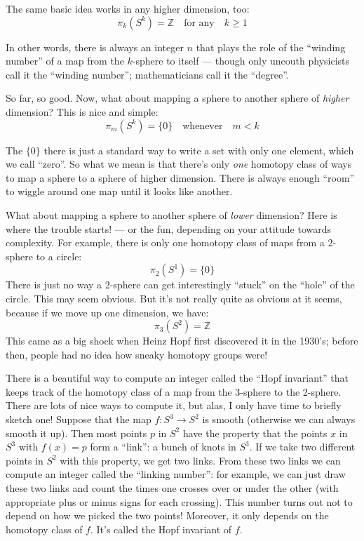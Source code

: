 \documentclass{article}
\begin{document}
The same basic idea works in any higher dimension, too:
\[\pi_k(S^k) = \mathbb{Z} \quad\text{for any}\quad k\geqslant 1\]

In other words, there is always an integer \(n\) that plays the role of
the ``winding number'' of a map from the \(k\)-sphere to itself ---
though only uncouth physicists call it the ``winding number'';
mathematicians call it the ``degree''.

So far, so good. Now, what about mapping a sphere to another sphere of
\emph{higher} dimension? This is nice and simple:
\[\pi_m(S^k) =\{0\} \quad\text{whenever}\quad m < k\]

The \(\{0\}\) there is just a standard way to write a set with only one
element, which we call ``zero''. So what we mean is that there's only
\emph{one} homotopy class of ways to map a sphere to a sphere of higher
dimension. There is always enough ``room'' to wiggle around one map
until it looks like another.

What about mapping a sphere to another sphere of \emph{lower} dimension?
Here is where the trouble starts! --- or the fun, depending on your
attitude towards complexity. For example, there is only one homotopy
class of maps from a 2-sphere to a circle: \[\pi_2(S^1) = \{0\}\] There
is just no way a 2-sphere can get interestingly ``stuck'' on the
``hole'' of the circle. This may seem obvious. But it's not really quite
as obvious at it seems, because if we move up one dimension, we have:
\[\pi_3(S^2) = \mathbb{Z}\] This came as a big shock when Heinz Hopf
first discovered it in the 1930's; before then, people had no idea how
sneaky homotopy groups were!

There is a beautiful way to compute an integer called the ``Hopf
invariant'' that keeps track of the homotopy class of a map from the
3-sphere to the 2-sphere. There are lots of nice ways to compute it, but
alas, I only have time to briefly sketch one! Suppose that the map
\(f\colon S^3\to S^2\) is smooth (otherwise we can always smooth it up).
Then most points \(p\) in \(S^2\) have the property that the points
\(x\) in \(S^3\) with \(f(x) = p\) form a ``link'': a bunch of knots in
\(S^3\). If we take two different points in \(S^2\) with this property,
we get two links. From these two links we can compute an integer called
the ``linking number'': for example, we can just draw these two links
and count the times one crosses over or under the other (with
appropriate plus or minus signs for each crossing). This number turns
out not to depend on how we picked the two points! Moreover, it only
depends on the homotopy class of \(f\). It's called the Hopf invariant
of \(f\).
\end{document}
